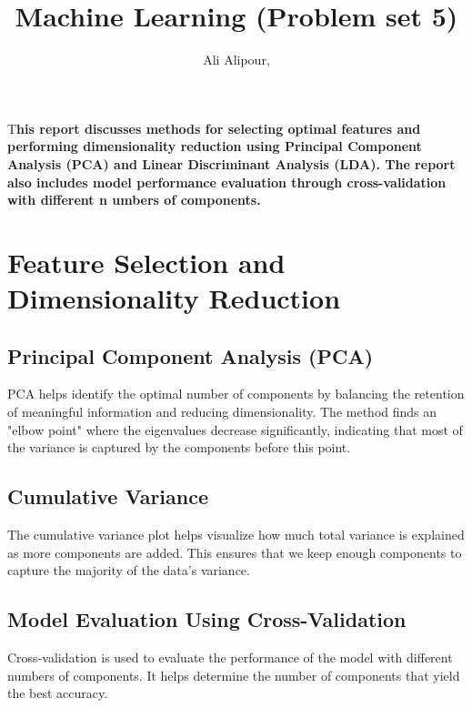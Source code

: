 \documentclass[DIV=calc, paper=a4, fontsize=11pt, twocolumn]{scrartcl}	 %
\title{Machine Learning (Problem set 5)} %
\author{Ali Alipour, } %
\date{} %
\newcommand{\initial}[1]{ %
\lettrine[lines=3,lhang=0.3,nindent=0em]{
\color{DarkGoldenrod}
{\textsf{#1}}}{}}
\begin{document}
\maketitle %

\thispagestyle{fancy} %


\initial{T}\textbf{his report discusses methods for selecting optimal features and performing dimensionality 
                   reduction using Principal Component Analysis (PCA) and Linear Discriminant Analysis (LDA). 
                   The report also includes model performance evaluation through cross-validation with different n
                   umbers of components.}

\section{\small{Feature Selection and Dimensionality Reduction}}

   \subsection{Principal Component Analysis (PCA)}
      PCA helps identify the optimal number of components by balancing the retention of meaningful information and 
      reducing dimensionality. The method finds an "elbow point" where the eigenvalues decrease significantly, 
      indicating that most of the variance is captured by the components before this point.

   \subsection{\small{Cumulative Variance}}
      The cumulative variance plot helps visualize how much total variance is explained as more components are added. 
      This ensures that we keep enough components to capture the majority of the data's variance.

   \subsection{\small{Model Evaluation Using Cross-Validation}}
      Cross-validation is used to evaluate the performance of the model with different numbers of components. 
      It helps determine the number of components that yield the best accuracy.
\end{document}
